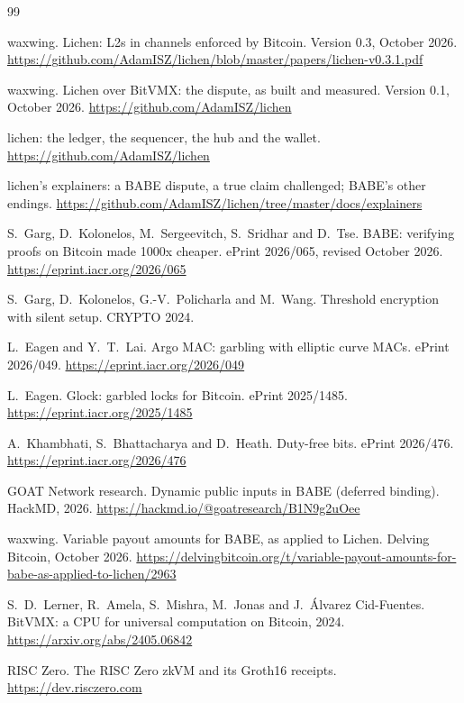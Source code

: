 \documentclass[11pt]{article}
\begin{document}
\begin{thebibliography}{99}

 waxwing. Lichen: L2s in channels enforced by Bitcoin. Version 0.3, October 2026. \url{https://github.com/AdamISZ/lichen/blob/master/papers/lichen-v0.3.1.pdf}

 waxwing. Lichen over BitVMX: the dispute, as built and measured. Version 0.1, October 2026. \url{https://github.com/AdamISZ/lichen}

 lichen: the ledger, the sequencer, the hub and the wallet. \url{https://github.com/AdamISZ/lichen}

 lichen's explainers: a BABE dispute, a true claim challenged; BABE's other endings. \url{https://github.com/AdamISZ/lichen/tree/master/docs/explainers}

 S.~Garg, D.~Kolonelos, M.~Sergeevitch, S.~Sridhar and D.~Tse. BABE: verifying proofs on Bitcoin made 1000x cheaper. ePrint 2026/065, revised October 2026. \url{https://eprint.iacr.org/2026/065}

 S.~Garg, D.~Kolonelos, G.-V.~Policharla and M.~Wang. Threshold encryption with silent setup. CRYPTO 2024.

 L.~Eagen and Y.~T.~Lai. Argo MAC: garbling with elliptic curve MACs. ePrint 2026/049. \url{https://eprint.iacr.org/2026/049}

 L.~Eagen. Glock: garbled locks for Bitcoin. ePrint 2025/1485. \url{https://eprint.iacr.org/2025/1485}

 A.~Khambhati, S.~Bhattacharya and D.~Heath. Duty-free bits. ePrint 2026/476. \url{https://eprint.iacr.org/2026/476}

 GOAT Network research. Dynamic public inputs in BABE (deferred binding). HackMD, 2026. \url{https://hackmd.io/@goatresearch/B1N9g2uOee}

 waxwing. Variable payout amounts for BABE, as applied to Lichen. Delving Bitcoin, October 2026. \url{https://delvingbitcoin.org/t/variable-payout-amounts-for-babe-as-applied-to-lichen/2963}

 S.~D.~Lerner, R.~Amela, S.~Mishra, M.~Jonas and J.~\'Alvarez Cid-Fuentes. BitVMX: a CPU for universal computation on Bitcoin, 2024. \url{https://arxiv.org/abs/2405.06842}

 RISC Zero. The RISC Zero zkVM and its Groth16 receipts. \url{https://dev.risczero.com}

\end{thebibliography}
\end{document}
